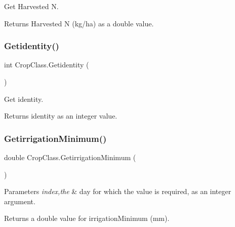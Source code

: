 Get Harvested N. 

\begin{DoxyReturn}{Returns}
Harvested N (kg/ha) as a double value. 
\end{DoxyReturn}
\mbox{\label{class_crop_class_afd387abad6de080d8a058b014a8dc6f0}} 
\subsubsection{\texorpdfstring{Getidentity()}{Getidentity()}}
{\footnotesize\ttfamily int Crop\+Class.\+Getidentity (\begin{DoxyParamCaption}{ }\end{DoxyParamCaption})\hspace{0.3cm}{\ttfamily [inline]}}



Get identity. 

\begin{DoxyReturn}{Returns}
identity as an integer value. 
\end{DoxyReturn}
\mbox{\label{class_crop_class_a50aef2adc5970044b629252000ccdf5f}} 
\subsubsection{\texorpdfstring{GetirrigationMinimum()}{GetirrigationMinimum()}}
{\footnotesize\ttfamily double Crop\+Class.\+Getirrigation\+Minimum (\begin{DoxyParamCaption}{ }\end{DoxyParamCaption})\hspace{0.3cm}{\ttfamily [inline]}}


\begin{DoxyParams}{Parameters}
{\em index,the} & day for which the value is required, as an integer argument. \\
\hline
\end{DoxyParams}
\begin{DoxyReturn}{Returns}
a double value for irrigation\+Minimum (mm). 
\end{DoxyReturn}
\mbox{\label{class_crop_class_a394943487b1741dc910a37130f7da65d}} 
